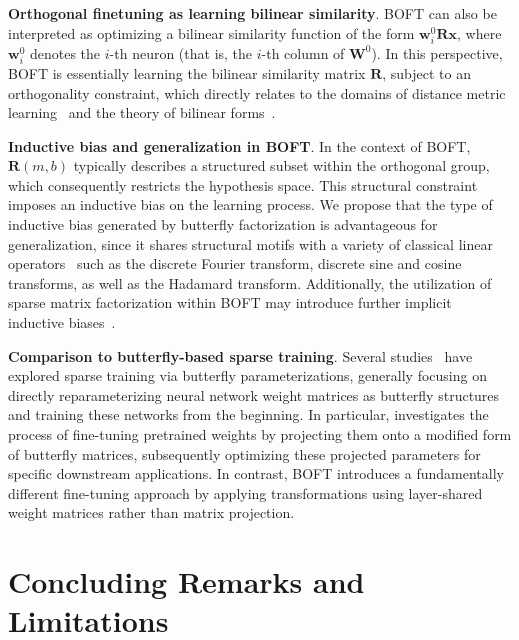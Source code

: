 \textbf{Orthogonal finetuning as learning bilinear similarity}. BOFT can also be interpreted as optimizing a bilinear similarity function of the form $\bm{w}^0_i\bm{R}\bm{x}$, where $\bm{w}^0_i$ denotes the $i$-th neuron (that is, the $i$-th column of $\bm{W}^0$). In this perspective, BOFT is essentially learning the bilinear similarity matrix $\bm{R}$, subject to an orthogonality constraint, which directly relates to the domains of distance metric learning~\cite{xing2002distance} and the theory of bilinear forms~\cite{roman2005advanced}.

\textbf{Inductive bias and generalization in BOFT}. In the context of BOFT, $\bm{R}(m,b)$ typically describes a structured subset within the orthogonal group, which consequently restricts the hypothesis space. This structural constraint imposes an inductive bias on the learning process. We propose that the type of inductive bias generated by butterfly factorization is advantageous for generalization, since it shares structural motifs with a variety of classical linear operators~\cite{dao2019kaleidoscope} such as the discrete Fourier transform, discrete sine and cosine transforms, as well as the Hadamard transform. Additionally, the utilization of sparse matrix factorization within BOFT may introduce further implicit inductive biases~\cite{gunasekar2017implicit,li2018algorithmic,liu2019neural}.

\textbf{Comparison to butterfly-based sparse training}. Several studies~\cite{dao2019learning,dao2019kaleidoscope,chen2022pixelated,dao2022monarch} have explored sparse training via butterfly parameterizations, generally focusing on directly reparameterizing neural network weight matrices as butterfly structures and training these networks from the beginning. In particular, \cite{dao2022monarch} investigates the process of fine-tuning pretrained weights by projecting them onto a modified form of butterfly matrices, subsequently optimizing these projected parameters for specific downstream applications. In contrast, BOFT introduces a fundamentally different fine-tuning approach by applying transformations using layer-shared weight matrices rather than matrix projection.



\section{Concluding Remarks and Limitations}

